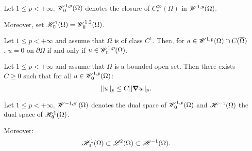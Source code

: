 \begin{definition}
    Let $1 \leq p < +\infty$, $\mathscr{W}^{1, p}_0(\Omega)$ denotes the closure of $C_c^{\infty}(\Omega)$ in $\mathscr{W}^{1, p}(\Omega)$.

    Moreover, set $\mathscr{H}^{1}_0(\Omega) = \mathscr{W}^{1, 2}_0(\Omega)$.
\end{definition}

\begin{theorem}
    Let $1 \leq p < +\infty$ and assume that $\Omega$ is of class $C^1$. Then, for $u \in \mathscr{W}^{1, p}(\Omega) \cap C(\overline{\Omega})$, $u = 0$ on $\partial \Omega$ if and only if $u \in \mathscr{W}^{1, p}_0(\Omega)$.
\end{theorem}

\begin{theorem}
    Let $1 \leq p < +\infty$ and assume that $\Omega$ is a bounded open set. Then there exists $C \geq 0$ such that for all $u \in \mathscr{W}^{1, p}_0(\Omega)$:
    \begin{align}
        \lVert u \rVert_p \leq C \lVert \bm{\nabla} u \rVert_p.
    \end{align}
\end{theorem}

\begin{definition}
    Let $1 \leq p < +\infty$, $\mathscr{W}^{-1, p^{\prime}}(\Omega)$ denotes the dual space of $\mathscr{W}^{1, p}_0(\Omega)$ and $\mathscr{H}^{-1}(\Omega)$ the dual space of $\mathscr{H}^{1}_0(\Omega)$.

    Moreover:
    \begin{align}
        \mathscr{H}^{1}_0(\Omega) \subset \mathscr{L}^{2}(\Omega) \subset \mathscr{H}^{-1}(\Omega).
    \end{align}
\end{definition}